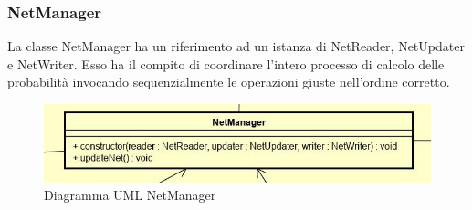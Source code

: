 \subsubsection{NetManager}
La classe NetManager ha un riferimento ad un istanza di NetReader, NetUpdater e NetWriter. Esso ha il compito di coordinare l'intero processo di calcolo delle probabilità invocando sequenzialmente le operazioni giuste nell'ordine corretto.
\begin{figure} [H]
	\centering
	\includegraphics[scale=0.8]{Img/NetManager}
	\caption{Diagramma UML NetManager}\label{}
\end{figure}
